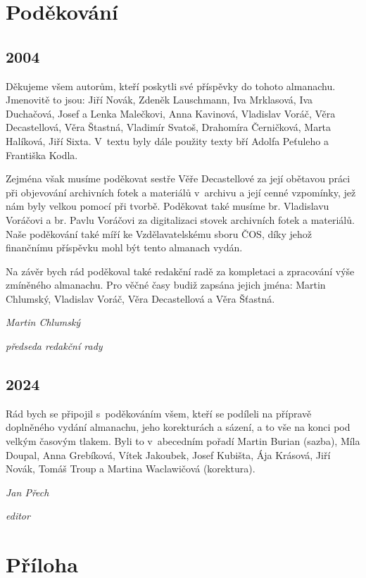 \documentclass[a5paper, 11pt, twoside]{article}
\begin{document}
\clearpage
\section{Poděkování}

\subsection*{2004}

Děkujeme všem autorům, kteří poskytli své příspěvky do tohoto almanachu.
Jmenovitě to jsou: Jiří Novák, Zdeněk Lauschmann, Iva Mrklasová, Iva
Duchačová, Josef a Lenka Malečkovi, Anna Kavinová, Vladislav Voráč, Věra
Decastellová, Věra Štastná, Vladimír Svatoš, Drahomíra Černičková, Marta
Halíková, Jiří Sixta. V~textu byly dále použity texty bří Adolfa
Peťuleho a Františka Kodla.

Zejména však musíme poděkovat sestře Věře Decastellové za její obětavou
práci při objevování archivních fotek a materiálů v~archivu a její cenné
vzpomínky, jež nám byly velkou pomocí při tvorbě. Poděkovat také musíme
br. Vladislavu Voráčovi a br. Pavlu Voráčovi za digitalizaci stovek
archivních fotek a materiálů. Naše poděkování také míří ke
Vzdělavatelskému sboru ČOS, díky jehož finančnímu příspěvku mohl být
tento almanach vydán.

Na závěr bych rád poděkoval také redakční radě za kompletaci a
zpracování výše zmíněného almanachu. Pro věčné časy budiž zapsána jejich
jména: Martin Chlumský, Vladislav Voráč, Věra Decastellová a Věra
Šťastná.

\hfill\textit{Martin Chlumský}

\hfill\textit{předseda redakční rady}

\subsection*{2024}

Rád bych se připojil s~poděkováním všem, kteří se podíleli na přípravě
doplněného vydání almanachu, jeho korekturách a sázení, a to vše na
konci pod velkým časovým tlakem. Byli to v~abecedním pořadí Martin
Burian (sazba), Míla Doupal, Anna Grebíková, Vítek Jakoubek, Josef
Kubišta, Ája Krásová, Jiří Novák, Tomáš Troup a Martina Waclawičová (korektura).

\hfill\textit{Jan Přech}

\hfill\textit{editor}

\cleardoublepage
\section{Příloha}
\end{document}
